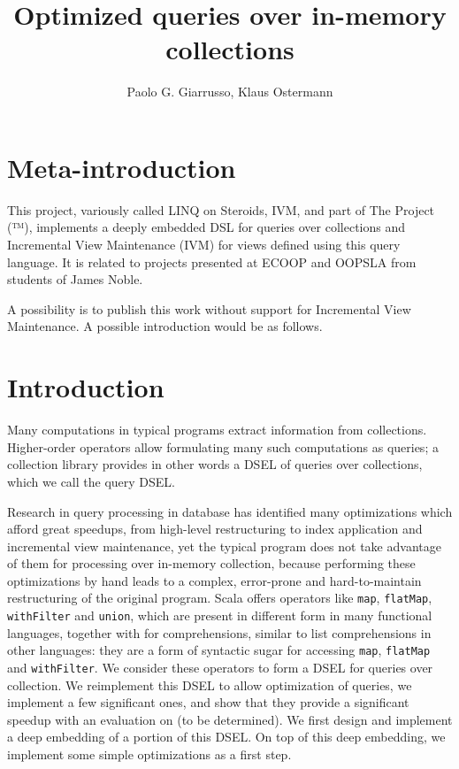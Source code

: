 \documentclass{article}
\title{Optimized queries over in-memory collections}
\author{Paolo G. Giarrusso, Klaus Ostermann}
\begin{document}
\maketitle

 \newcommand{\intersect}{\wedge}

\section{Meta-introduction}

This project, variously called LINQ on Steroids, IVM, and part of The
Project (™), implements a deeply embedded DSL for queries over
collections and Incremental View Maintenance (IVM) for views defined
using this query language. It is related to projects presented at ECOOP
and OOPSLA from students of James Noble.

A possibility is to publish this work without support for Incremental
View Maintenance. A possible introduction would be as follows.

\section{Introduction}

Many computations in typical programs extract information from
collections. Higher-order operators allow formulating many such
computations as queries; a collection library provides in other words a
DSEL of queries over collections, which we call the query DSEL.

Research in query processing in database has identified many
optimizations which afford great speedups, from high-level restructuring
to index application and incremental view maintenance, yet the typical
program does not take advantage of them for processing over in-memory
collection, because performing these optimizations by hand leads to a
complex, error-prone and hard-to-maintain restructuring of the original
program. Scala offers operators like \texttt{map}, \texttt{flatMap},
\texttt{withFilter} and \texttt{union}, which are present in different
form in many functional languages, together with for comprehensions,
similar to list comprehensions in other languages: they are a form of
syntactic sugar for accessing \texttt{map}, \texttt{flatMap} and
\texttt{withFilter}. We consider these operators to form a DSEL for
queries over collection. We reimplement this DSEL to allow optimization
of queries, we implement a few significant ones, and show that they
provide a significant speedup with an evaluation on (to be determined).
We first design and implement a deep embedding of a portion of this
DSEL. On top of this deep embedding, we implement some simple
optimizations as a first step.
\end{document}
